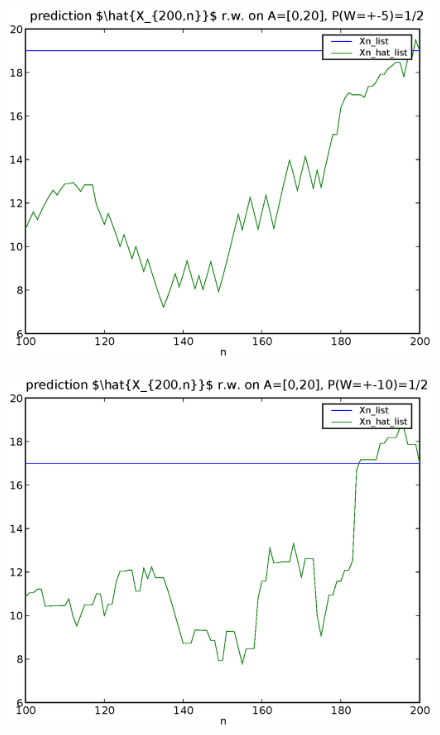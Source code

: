\documentclass[a4paper,10pt]{article}
\begin{document}
\begin{figure}
\includegraphics[width=1\textwidth]{hw6_1_b_K_20_L_5_T_200.eps}
\caption{}\label{f4}
\end{figure}

\begin{figure}
\includegraphics[width=1\textwidth]{hw6_1_b_K_20_L_10_T_200.eps}
\caption{}\label{f5}
\end{figure}
\end{document}
